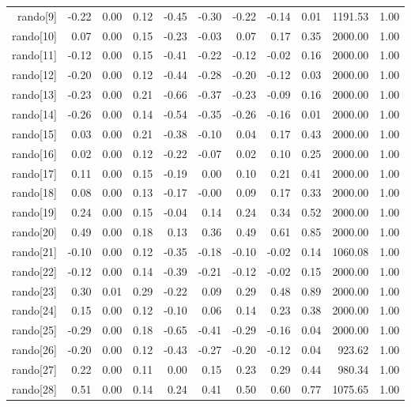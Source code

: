 \begin{table}[ht]
\begin{tabular}{rrrrrrrrrrr}
  rando[9] & -0.22 & 0.00 & 0.12 & -0.45 & -0.30 & -0.22 & -0.14 & 0.01 & 1191.53 & 1.00 \\ 
  rando[10] & 0.07 & 0.00 & 0.15 & -0.23 & -0.03 & 0.07 & 0.17 & 0.35 & 2000.00 & 1.00 \\ 
  rando[11] & -0.12 & 0.00 & 0.15 & -0.41 & -0.22 & -0.12 & -0.02 & 0.16 & 2000.00 & 1.00 \\ 
  rando[12] & -0.20 & 0.00 & 0.12 & -0.44 & -0.28 & -0.20 & -0.12 & 0.03 & 2000.00 & 1.00 \\ 
  rando[13] & -0.23 & 0.00 & 0.21 & -0.66 & -0.37 & -0.23 & -0.09 & 0.16 & 2000.00 & 1.00 \\ 
  rando[14] & -0.26 & 0.00 & 0.14 & -0.54 & -0.35 & -0.26 & -0.16 & 0.01 & 2000.00 & 1.00 \\ 
  rando[15] & 0.03 & 0.00 & 0.21 & -0.38 & -0.10 & 0.04 & 0.17 & 0.43 & 2000.00 & 1.00 \\ 
  rando[16] & 0.02 & 0.00 & 0.12 & -0.22 & -0.07 & 0.02 & 0.10 & 0.25 & 2000.00 & 1.00 \\ 
  rando[17] & 0.11 & 0.00 & 0.15 & -0.19 & 0.00 & 0.10 & 0.21 & 0.41 & 2000.00 & 1.00 \\ 
  rando[18] & 0.08 & 0.00 & 0.13 & -0.17 & -0.00 & 0.09 & 0.17 & 0.33 & 2000.00 & 1.00 \\ 
  rando[19] & 0.24 & 0.00 & 0.15 & -0.04 & 0.14 & 0.24 & 0.34 & 0.52 & 2000.00 & 1.00 \\ 
  rando[20] & 0.49 & 0.00 & 0.18 & 0.13 & 0.36 & 0.49 & 0.61 & 0.85 & 2000.00 & 1.00 \\ 
  rando[21] & -0.10 & 0.00 & 0.12 & -0.35 & -0.18 & -0.10 & -0.02 & 0.14 & 1060.08 & 1.00 \\ 
  rando[22] & -0.12 & 0.00 & 0.14 & -0.39 & -0.21 & -0.12 & -0.02 & 0.15 & 2000.00 & 1.00 \\ 
  rando[23] & 0.30 & 0.01 & 0.29 & -0.22 & 0.09 & 0.29 & 0.48 & 0.89 & 2000.00 & 1.00 \\ 
  rando[24] & 0.15 & 0.00 & 0.12 & -0.10 & 0.06 & 0.14 & 0.23 & 0.38 & 2000.00 & 1.00 \\ 
  rando[25] & -0.29 & 0.00 & 0.18 & -0.65 & -0.41 & -0.29 & -0.16 & 0.04 & 2000.00 & 1.00 \\ 
  rando[26] & -0.20 & 0.00 & 0.12 & -0.43 & -0.27 & -0.20 & -0.12 & 0.04 & 923.62 & 1.00 \\ 
  rando[27] & 0.22 & 0.00 & 0.11 & 0.00 & 0.15 & 0.23 & 0.29 & 0.44 & 980.34 & 1.00 \\ 
  rando[28] & 0.51 & 0.00 & 0.14 & 0.24 & 0.41 & 0.50 & 0.60 & 0.77 & 1075.65 & 1.00 \\ 

\end{tabular}
\end{table}
